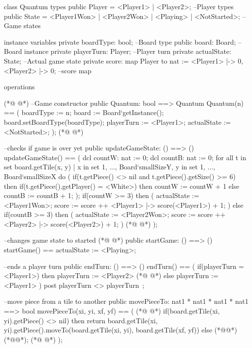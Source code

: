 \begin{vdmpp}[breaklines=true]
class Quantum
types
  public Player = <Player1> | <Player2>; --Player types
  public State = <Player1Won> | <Player2Won> | <Playing> | <NotStarted>; --Game states

instance variables
  private boardType: bool; --Board type
  public board: Board; --Board instance
  private playerTurn: Player; --Player turn
  private actualState: State; --Actual game state
  private score: map Player to nat := {<Player1> |-> 0, <Player2> |-> 0}; --score map
 
operations
  
(*@
\label{Quantum:15}
@*)
  --Game constructor
  public Quantum: bool ==> Quantum
    Quantum(n) == (
   boardType := n;
   board := Board`getInstance();
   board.setBoardType(boardType);
   playerTurn := <Player1>;
   actualState := <NotStarted>;
    );      
(*@
\label{updateGameState:24}
@*)
      
    --checks if game is over yet          
    public updateGameState: () ==> ()
    updateGameState() == (
      dcl countW: nat := 0;
      dcl countB: nat := 0;
      for all t in set {board.getTile(x, y) | x in set {1, ..., Board`smallSizeY}, y in set {1, ..., Board`smallSizeX}} 
       do (
        if(t.getPiece() <> nil and t.getPiece().getSize() >= 6) then
         if(t.getPiece().getPlayer() = <White>) then countW := countW + 1
         else countB := countB + 1;
       );
      if(countW >= 3) then (
       actualState := <Player1Won>;
       score := score ++ {<Player1> |-> score(<Player1>) + 1};
       )
      else if(countB >= 3) then (
       actualState := <Player2Won>;
       score := score ++ {<Player2> |-> score(<Player2>) + 1};
       )
(*@
\label{startGame:44}
@*)
    );   
    
    --changes game state to started      
(*@
\label{endTurn:47}
@*)
    public startGame: () ==> ()
    startGame() == actualState := <Playing>;  
    
    --ends a player turn
    public endTurn: () ==> ()
    endTurn() == (
     if(playerTurn = <Player1>) then playerTurn := <Player2>
(*@
\label{movePieceTo:54}
@*)
     else playerTurn := <Player1>
    )
    post playerTurn <> playerTurn~;
    
    --move piece from a tile to another
    public movePieceTo: nat1 * nat1 * nat1 * nat1 ==> bool
    movePieceTo(xi, yi, xf, yf) == (
(*@
\label{getGameState:61}
@*)
     if(board.getTile(xi, yi).getPiece() <> nil)
      then return board.getTile(xi, yi).getPiece().moveTo(board.getTile(xi, yi), board.getTile(xf, yf))
     else (*@@*) (*@@*);
(*@
\label{getActualPlayer:64}
@*)
    );
    

\end{vdmpp}
